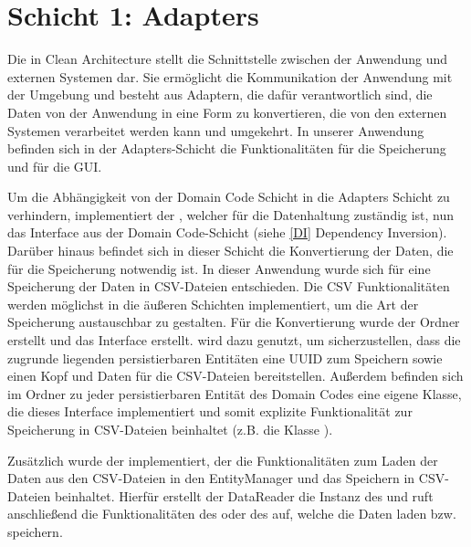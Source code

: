 \section{Schicht 1: Adapters}\label{Adapters}
Die \href{https://github.com/MichaelaHaag/RezeptApp/tree/main/1-Adapter}{} in Clean Architecture stellt die Schnittstelle zwischen der Anwendung und externen Systemen dar. Sie ermöglicht die Kommunikation der Anwendung mit der Umgebung und besteht aus Adaptern, die dafür verantwortlich sind, die Daten von der Anwendung in eine Form zu konvertieren, die von den externen Systemen verarbeitet werden kann und umgekehrt. In unserer Anwendung befinden sich in der Adapters-Schicht die Funktionalitäten für die Speicherung und für die GUI. 

Um die Abhängigkeit von der Domain Code Schicht in die Adapters Schicht zu verhindern, implementiert der \href{https://github.com/MichaelaHaag/RezeptApp/tree/main/1-Adapter/src/main/java/de/rezeptapp/adapter/Datenpersistenz/EntityManager.java}{}, welcher für die Datenhaltung zuständig ist, nun das Interface  aus der Domain Code-Schicht (siehe \autoref{DI} Dependency Inversion). Darüber hinaus befindet sich in dieser Schicht die Konvertierung der Daten, die für die Speicherung notwendig ist. In dieser Anwendung wurde sich für eine Speicherung der Daten in CSV-Dateien entschieden. Die CSV Funktionalitäten werden möglichst in die äußeren Schichten implementiert, um die Art der Speicherung austauschbar zu gestalten. 
Für die Konvertierung wurde der Ordner \href{https://github.com/MichaelaHaag/RezeptApp/tree/main/1-Adapter/src/main/java/de/rezeptapp/adapter/Datenpersistenz}{} erstellt und das Interface \href{https://github.com/MichaelaHaag/RezeptApp/blob/main/1-Adapter/src/main/java/de/rezeptapp/adapter/Datenpersistenz/ICSVPersistierbar.java}{} erstellt.  wird dazu genutzt, um sicherzustellen, dass die zugrunde liegenden persistierbaren Entitäten eine UUID zum Speichern sowie einen Kopf und Daten für die CSV-Dateien bereitstellen. Außerdem befinden sich im Ordner zu jeder persistierbaren Entität des Domain Codes eine eigene Klasse, die dieses Interface implementiert und somit explizite Funktionalität zur Speicherung in CSV-Dateien beinhaltet (z.B. die Klasse \href{https://github.com/MichaelaHaag/RezeptApp/blob/main/1-Adapter/src/main/java/de/rezeptapp/adapter/Datenpersistenz/CSVZutat.java}{}). 

Zusätzlich wurde der \href{https://github.com/MichaelaHaag/RezeptApp/tree/main/1-Adapter/src/main/java/de/rezeptapp/adapter/Datenpersistenz/DataReader.java}{} implementiert, der die Funktionalitäten zum Laden der Daten aus den CSV-Dateien in den EntityManager und das Speichern in CSV-Dateien beinhaltet. Hierfür erstellt der DataReader die Instanz des  und ruft anschließend die Funktionalitäten des  oder des  auf, welche die Daten laden bzw. speichern. 


